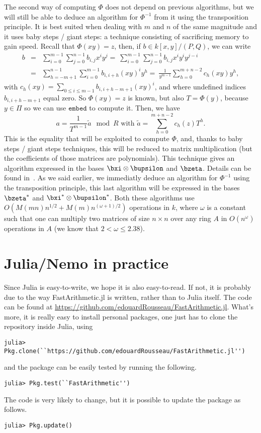 \documentclass[a4paper,11pt]{article}
\theoremstyle{break}
\theoremstyle{definition}
\theoremstyle{remark}
\begin{document}
The second way of computing $\Phi$ does not depend on previous algorithms, but 
we will still be able to deduce an algorithm for $\Phi^{-1}$ from it using the 
transposition principle. It is best suited when dealing with $m$ and $n$ of the 
same magnitude and it uses baby steps / giant steps: a technique consisting of 
sacrificing memory to gain speed. Recall that $\Phi(xy)=z$, then, if $b\in 
k[x,y]/(P,Q)$, we can write
\begin{eqnarray*}
b&=&\sum_{i=0}^{m-1}\sum_{j=0}^{n-1} b_{i,j}x^i y^j
=~\sum_{i=0}^{m-1}\sum_{j=0}^{n-1} b_{i,j}x^i y^i y^{j-i}\\
&=&\sum_{h=-m+1}^{n-1}\sum_{i=0}^{m-1} b_{i,i+h}(xy)^i y^h
=~\frac{1}{y^{m-1}} \sum_{h=0}^{m+n-2} c_h(xy) y^h,
\end{eqnarray*}
with $c_h(xy)=\sum_{0 \leq i \leq m-1} b_{i,i+h-m+1} (xy)^i$, and where 
undefined indices $b_{i,i+h-m+1}$ equal zero. So $\Phi(xy)=z$ is known, but 
also $T=\Phi(y)$, because $y\in\Pi$ so we can use $\texttt{embed}$ to compute 
it. Then, we have 
\[
a = \frac{1}{T^{m-1}}\tilde a \mod R \text{ with } \tilde a = \sum_{h=0}^{m+n-2} 
c_h(z) T^h.
\]
This is the equality that will be exploited to compute $\Phi$, and, thanks to 
baby steps / giant steps techniques, this will be reduced to matrix 
multiplication (but the coefficients of those matrices are polynomials). This 
technique gives an algorithm expressed in the bases $\bxi\otimes\bupsilon$ and 
$\bzeta$. Details can be found in~\cite{DeDoSc14}. As we said earlier, we 
immediatly deduce an algorithm for $\Phi^{-1}$ using the 
transposition principle, this last algorithm will be expressed in the bases 
$\bzeta^*$ and $\bxi^*\otimes\bupsilon^*$. Both these algorithms use 
$O(M(mn)n^{1/2}+M(m)n^{(\omega+1)/2})$ operations in $k$, where $\omega$ is a 
constant such that one can multiply two matrices of size $n\times n$ over any 
ring $A$ in $O(n^\omega)$ operations in $A$ (we know that $2 < \omega \leq 
2.38$).


\section{Julia/Nemo in practice}
Since Julia is easy-to-write, we hope it is also
easy-to-read. If not, it is probably due to the way FastArithmetic.jl is written,
rather than to Julia itself. The code can be found at
\url{https://github.com/edouardRousseau/FastArithmetic.jl}. What's more, it is really
easy to install personal packages, one just has to clone the repository
inside Julia, using
\begin{verbatim}
julia> Pkg.clone(``https://github.com/edouardRousseau/FastArithmetic.jl'') 
\end{verbatim}
and the package can be easily tested by running the following.
\begin{verbatim}
julia> Pkg.test(``FastArithmetic'') 
\end{verbatim}
The code is very likely to change, but it is possible to update the package as
follows.
\begin{verbatim}
julia> Pkg.update()
\end{verbatim}
\end{document}
